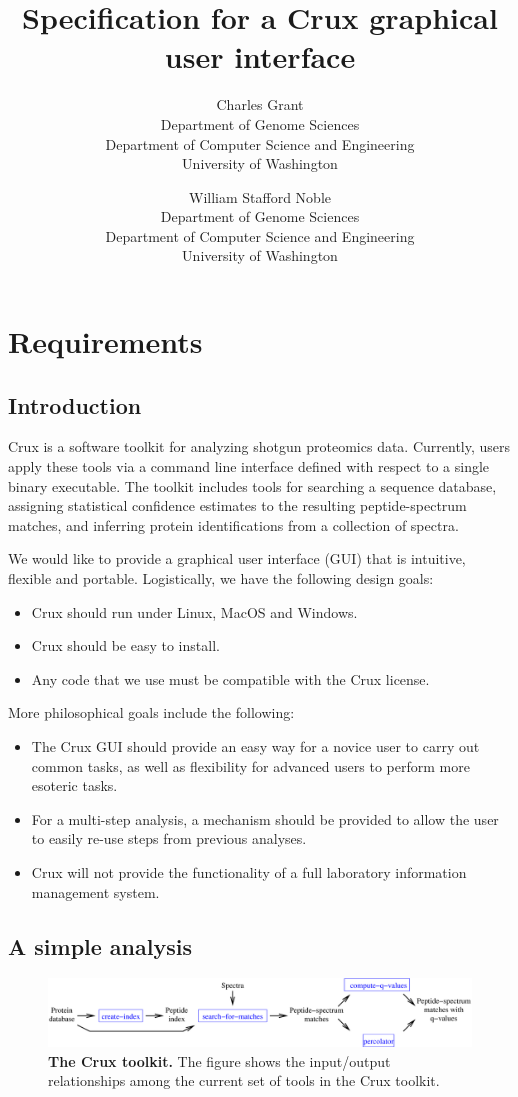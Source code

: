 \documentclass{article}
\title{Specification for a Crux graphical user interface}
\author{
Charles Grant\\
Department of Genome Sciences\\
Department of Computer Science and Engineering\\
University of Washington
\and
William Stafford Noble\\
Department of Genome Sciences\\
Department of Computer Science and Engineering\\
University of Washington}
\begin{document}
\maketitle

\section{Requirements}
\subsection{Introduction}

Crux is a software toolkit for analyzing shotgun proteomics data.
Currently, users apply these tools via a command line interface defined
with respect to a single binary executable.  The toolkit includes
tools for searching a sequence database, assigning statistical
confidence estimates to the resulting peptide-spectrum matches, and
inferring protein identifications from a collection of spectra.

We would like to provide a graphical user interface (GUI) that is
intuitive, flexible and portable.  Logistically, we have the following
design goals:
\begin{itemize}
\item Crux should run under Linux, MacOS and Windows.
\item Crux should be easy to install.
\item Any code that we use must be compatible with the Crux license.
\end{itemize}
More philosophical goals include the following:
\begin{itemize}
\item The Crux GUI should provide an easy way for a novice user to
  carry out common tasks, as well as flexibility for advanced users to
  perform more esoteric tasks.
\item For a multi-step analysis, a mechanism should be provided to
  allow the user to easily re-use steps from previous analyses.
\item Crux will not provide the functionality of a full laboratory
  information management system.
\end{itemize}

\subsection{A simple analysis}

\begin{figure}
\centering
\includegraphics[width=6in]{schematic.eps}
\caption{{\bf The Crux toolkit.}  The figure shows the input/output
  relationships among the current set of tools in the Crux toolkit.
  \label{figure:schematic}}
\end{figure}
\end{document}
